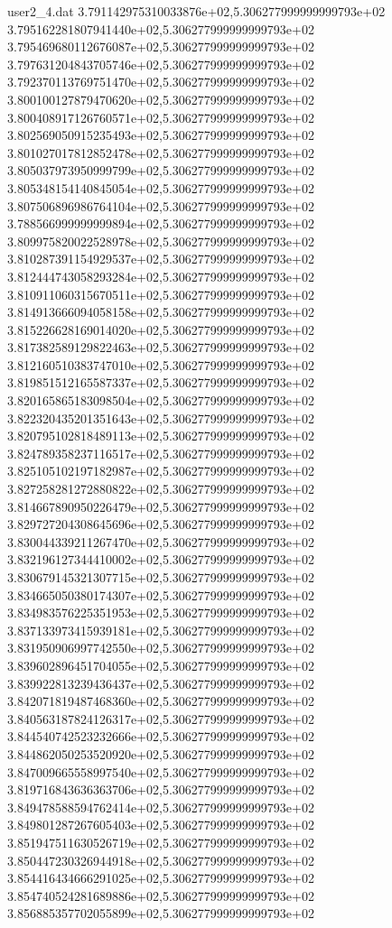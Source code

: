 \begin{filecontents}{user2_4.dat}
3.791142975310033876e+02,5.306277999999999793e+02
3.795162281807941440e+02,5.306277999999999793e+02
3.795469680112676087e+02,5.306277999999999793e+02
3.797631204843705746e+02,5.306277999999999793e+02
3.792370113769751470e+02,5.306277999999999793e+02
3.800100127879470620e+02,5.306277999999999793e+02
3.800408917126760571e+02,5.306277999999999793e+02
3.802569050915235493e+02,5.306277999999999793e+02
3.801027017812852478e+02,5.306277999999999793e+02
3.805037973950999799e+02,5.306277999999999793e+02
3.805348154140845054e+02,5.306277999999999793e+02
3.807506896986764104e+02,5.306277999999999793e+02
3.788566999999999894e+02,5.306277999999999793e+02
3.809975820022528978e+02,5.306277999999999793e+02
3.810287391154929537e+02,5.306277999999999793e+02
3.812444743058293284e+02,5.306277999999999793e+02
3.810911060315670511e+02,5.306277999999999793e+02
3.814913666094058158e+02,5.306277999999999793e+02
3.815226628169014020e+02,5.306277999999999793e+02
3.817382589129822463e+02,5.306277999999999793e+02
3.812160510383747010e+02,5.306277999999999793e+02
3.819851512165587337e+02,5.306277999999999793e+02
3.820165865183098504e+02,5.306277999999999793e+02
3.822320435201351643e+02,5.306277999999999793e+02
3.820795102818489113e+02,5.306277999999999793e+02
3.824789358237116517e+02,5.306277999999999793e+02
3.825105102197182987e+02,5.306277999999999793e+02
3.827258281272880822e+02,5.306277999999999793e+02
3.814667890950226479e+02,5.306277999999999793e+02
3.829727204308645696e+02,5.306277999999999793e+02
3.830044339211267470e+02,5.306277999999999793e+02
3.832196127344410002e+02,5.306277999999999793e+02
3.830679145321307715e+02,5.306277999999999793e+02
3.834665050380174307e+02,5.306277999999999793e+02
3.834983576225351953e+02,5.306277999999999793e+02
3.837133973415939181e+02,5.306277999999999793e+02
3.831950906997742550e+02,5.306277999999999793e+02
3.839602896451704055e+02,5.306277999999999793e+02
3.839922813239436437e+02,5.306277999999999793e+02
3.842071819487468360e+02,5.306277999999999793e+02
3.840563187824126317e+02,5.306277999999999793e+02
3.844540742523232666e+02,5.306277999999999793e+02
3.844862050253520920e+02,5.306277999999999793e+02
3.847009665558997540e+02,5.306277999999999793e+02
3.819716843636363706e+02,5.306277999999999793e+02
3.849478588594762414e+02,5.306277999999999793e+02
3.849801287267605403e+02,5.306277999999999793e+02
3.851947511630526719e+02,5.306277999999999793e+02
3.850447230326944918e+02,5.306277999999999793e+02
3.854416434666291025e+02,5.306277999999999793e+02
3.854740524281689886e+02,5.306277999999999793e+02
3.856885357702055899e+02,5.306277999999999793e+02

\end{filecontents}
